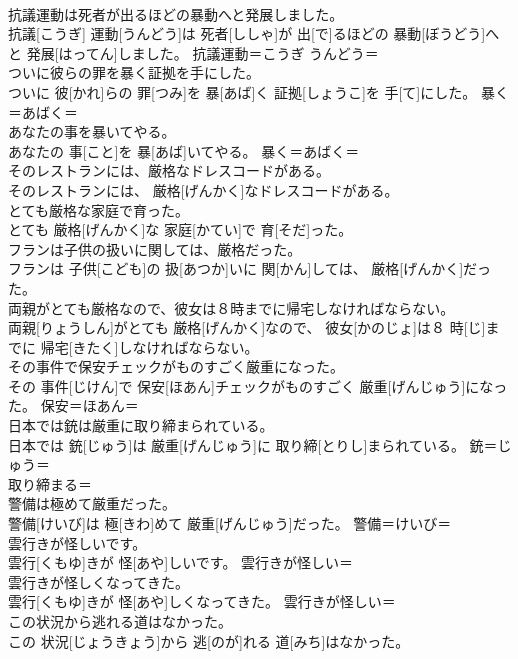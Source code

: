 \documentclass[8pt]{extreport}
\begin{document}
\begin{CJK}{UTF8}{min}
\\	抗議運動は死者が出るほどの暴動へと発展しました。	
\\	抗議[こうぎ] 運動[うんどう]は 死者[ししゃ]が 出[で]るほどの 暴動[ぼうどう]へと 発展[はってん]しました。	抗議運動＝こうぎ うんどう＝ 
\\	ついに彼らの罪を暴く証拠を手にした。	
\\	ついに 彼[かれ]らの 罪[つみ]を 暴[あば]く 証拠[しょうこ]を 手[て]にした。	暴く＝あばく＝ 
\\	あなたの事を暴いてやる。	
\\	あなたの 事[こと]を 暴[あば]いてやる。	暴く＝あばく＝ 
\\	そのレストランには、厳格なドレスコードがある。	
\\	そのレストランには、 厳格[げんかく]なドレスコードがある。	
\\	とても厳格な家庭で育った。	
\\	とても 厳格[げんかく]な 家庭[かてい]で 育[そだ]った。	
\\	フランは子供の扱いに関しては、厳格だった。	
\\	フランは 子供[こども]の 扱[あつか]いに 関[かん]しては、 厳格[げんかく]だった。	
\\	両親がとても厳格なので、彼女は８時までに帰宅しなければならない。	
\\	両親[りょうしん]がとても 厳格[げんかく]なので、 彼女[かのじょ]は８ 時[じ]までに 帰宅[きたく]しなければならない。	
\\	その事件で保安チェックがものすごく厳重になった。	
\\	その 事件[じけん]で 保安[ほあん]チェックがものすごく 厳重[げんじゅう]になった。	保安＝ほあん＝ 
\\	日本では銃は厳重に取り締まられている。	
\\	日本では 銃[じゅう]は 厳重[げんじゅう]に 取り締[とりし]まられている。	銃＝じゅう＝ 
\\	取り締まる＝ 
\\	警備は極めて厳重だった。	
\\	警備[けいび]は 極[きわ]めて 厳重[げんじゅう]だった。	警備＝けいび＝ 
\\	雲行きが怪しいです。	
\\	雲行[くもゆ]きが 怪[あや]しいです。	雲行きが怪しい＝ 
\\	雲行きが怪しくなってきた。	
\\	雲行[くもゆ]きが 怪[あや]しくなってきた。	雲行きが怪しい＝ 
\\	この状況から逃れる道はなかった。	
\\	この 状況[じょうきょう]から 逃[のが]れる 道[みち]はなかった。	

\end{CJK}
\end{document}
